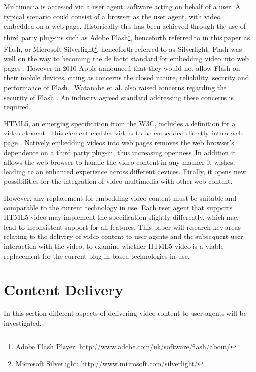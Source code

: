 \documentclass[journal]{IEEEtran}
\begin{document}
Multimedia is accessed via a user agent: software acting on behalf of a user. A typical scenario could consist of a browser as the user agent, with video embedded on a web page. Historically this has been achieved through the use of third party plug-ins such as Adobe Flash\footnote{Adobe Flash Player: \url{http://www.adobe.com/uk/software/flash/about/}}, henceforth referred to in this paper as Flash, or Microsoft Silverlight\footnote{Microsoft Silverlight: \url{http://www.microsoft.com/silverlight/}}, henceforth referred to as Silverlight. Flash was well on the way to becoming the de facto standard for embedding video into web pages \cite{article:HTML5LeadsAWebRevolution}. However in 2010 Apple announced that they would not allow Flash on their mobile devices, citing as concerns the closed nature, reliability, security and performance of Flash \cite{website:appleFlash}. Watanabe et al. also raised concerns regarding the security of Flash \cite{inproceedings:flashSecurity}. An industry agreed standard addressing these concerns is required.

HTML5, an emerging specification from the W3C, includes a definition for a video element. This element enables videos to be embedded directly into a web page \cite{standard:html5}. Natively embedding videos into web pages removes the web browser's dependence on a third party plug-in, thus increasing openness. In addition it allows the web browser to handle the video content in any manner it wishes, leading to an enhanced experience across different devices. Finally, it opens new possibilities for the integration of video multimedia with other web content.

However, any replacement for embedding video content must be suitable and comparable to the current technology in use. Each user agent that supports HTML5 video may implement the specification slightly differently, which may lead to inconsistent support for all features. This paper will research key areas relating to the delivery of video content to user agents and the subsequent user interaction with the video, to examine whether HTML5 video is a viable replacement for the current plug-in based technologies in use.

\section{Content Delivery}
In this section different aspects of delivering video content to user agents will be investigated.
\end{document}
